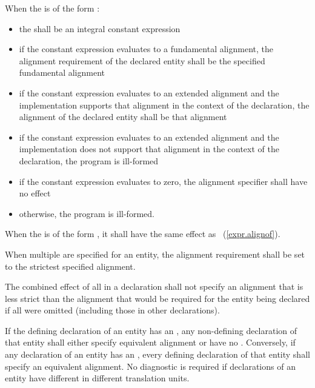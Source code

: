 \pnum
When the  is of the form
  \tcode{)}:

\begin{itemize}
\item the  shall be an integral constant expression

\item if the constant expression evaluates to a fundamental alignment,
the alignment requirement of the declared entity shall be the specified
fundamental alignment

\item if the constant expression evaluates to an extended alignment and
the implementation supports that alignment in the context of the declaration,
the alignment of the declared entity shall be that alignment

\item if the constant expression evaluates to an extended alignment and
the implementation does not support that alignment in the context of the
declaration, the program is ill-formed

\item if the constant expression evaluates to zero, the alignment specifier
shall have no effect

\item otherwise, the program is ill-formed.
\end{itemize}

\pnum
When the  is of the form
  \tcode{)}, it shall have the same
effect as \tcode{))}~(\ref{expr.alignof}).

\pnum
When multiple  are specified for an entity, the
alignment requirement shall be set to the strictest specified alignment.

\pnum
The combined effect of all  in a declaration shall not
specify an alignment that is less strict than the alignment that would
be required for the entity being declared if all 
were omitted (including those in other declarations).

\pnum
If the defining declaration of an entity has an
, any non-defining
declaration of that entity shall either specify equivalent alignment or have no
.
Conversely, if any declaration of an entity has an
,
every defining
declaration of that entity shall specify an equivalent alignment.
No diagnostic is required if declarations of an entity have
different 
in different translation units.

